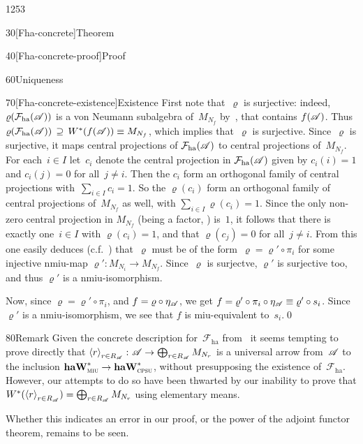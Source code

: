 \begin{parsec}{1253}
\begin{point}{30}[Fha-concrete]{Theorem}
\begin{point}{40}[Fha-concrete-proof]{Proof}
\begin{point}{60}{Uniqueness}
\begin{point}{70}[Fha-concrete-existence]{Existence}
First note that~$\varrho$ is surjective:
indeed, $\varrho(\mathcal{F}_\mathrm{ha}(\mathscr{A}))$
is a von Neumann subalgebra of~$M_{N_f}$ by~,
that contains $f(\mathscr{A})$.
Thus $\varrho(\mathcal{F}_\mathrm{ha}(\mathscr{A}))
    \,\supseteq\, W^*(f(\mathscr{A}))\equiv M_{N_f}$,
which implies that~$\varrho$ is surjective.
Since~$\varrho$ is surjective, it maps central projections
    of $\mathcal{F}_\mathrm{ha}(\mathscr{A})$
    to central projections
    of~$M_{N_f}$.
    For each~$i\in I$ let~$c_i$
    denote the central projection in $\mathcal{F}_\mathrm{ha}(\mathscr{A})$
    given by $c_i(i)=1$ and $c_i(j)=0$ for all~$j\neq i$.
    Then the $c_i$ form an orthogonal family
    of  central projections with~$\sum_{i\in I}c_i =1$.
    So the $\varrho(c_i)$
    form an orthogonal family
    of central projections of~$M_{N_f}$ as well, 
    with $\sum_{i\in I} \varrho(c_i)=1$.
Since the only non-zero central projection in 
    $M_{N_f}$ (being a factor, ) is~$1$,
    it follows that there is exactly one~$i\in I$
    with $\varrho(c_i)=1$,
    and that $\varrho(c_j)=0$ for all~$j\neq i$.
    From this one easily deduces (c.f.~) 
    that~$\varrho$ must be of the form~$\varrho = \varrho'\circ \pi_i$
    for some injective nmiu-map $\varrho'\colon M_{N_i}\to M_{N_f}$.
    Since~$\varrho$ is surjectve, $\varrho'$ is surjective too,
    and thus $\varrho'$ is a nmiu-isomorphism.

Now, since $\varrho = \varrho' \circ \pi_i $,
and $f=\varrho\circ \eta_{\mathscr{A}}$,
we get $f = \varrho' \circ \pi_i \circ \eta_{\mathscr{A}}\equiv
\varrho' \circ s_i$.
Since~$\varrho'$ is a nmiu-isomorphism,
we see that $f$ is miu-equivalent to~$s_i$.\qed
\end{point}
\end{point}
\end{point}
\end{point}
\begin{point}{80}{Remark}%
Given the concrete description for~$\mathcal{F}_\mathrm{ha}$
from~
it seems tempting to prove directly
that $\left<r\right>_{r\in R_{\mathscr{A}}}
\colon \mathscr{A}\to\bigoplus_{r\in R_{\mathscr{A}}}M_{N_r}$
is a universal arrow from~$\mathscr{A}$ to the inclusion
$\mathbf{haW}^*_{\text{\textsc{miu}}}\to\mathbf{haW}^*_{\text{\textsc{cpsu}}}$,
without presupposing the existence of~$\mathcal{F}_\mathrm{ha}$.
However, our attempts to do so have been thwarted
by our inability to prove  that
$W^*(\left<r\right>_{r\in R_{\mathscr{A}}})
= \bigoplus_{r\in R_{\mathscr{A}}} M_{N_r}$
using elementary means.

Whether this indicates an error in our proof,
or the power of the adjoint functor theorem,
remains to be seen.
\end{point}
\end{parsec}%
